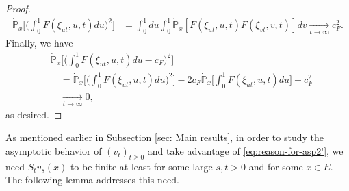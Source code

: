 \documentclass[UTF8]{pkuthss}
\theoremstyle{plain}
\theoremstyle{definition}
\numberwithin{equation}{section}
\begin{document}
\begin{proof}
\[\begin{split}
	\dot{\mathbb P}_x\Big[\big(\int_0^1 F(\xi_{ut},u,t)du\big)^2\Big]
	&=\int_0^1du\int_0^1\dot{\mathbb P}_x[F(\xi_{ut},u,t)F(\xi_{vt},v,t)]dv\xrightarrow[t\to\infty]{} c_F^2.
\end{split}\]
	Finally, we have
\[\begin{split}
	&\dot{\mathbb P}_x\Big[\big(\int_0^1 F(\xi_{ut},u,t)du - c_F\big)^2\Big]\\
	&\quad =\dot{\mathbb P}_x\Big[\big(\int_0^1 F(\xi_{ut},u,t)du\big)^2\Big] -2c_F \dot{\mathbb P}_x\Big[\int_0^1 F(\xi_{ut},u,t)du\Big]+ c_F^2\\
	&\quad \xrightarrow[t\to\infty]{} 0,
\end{split}\]
	as desired.
\end{proof}

	As mentioned earlier in Subsection \ref{sec: Main results}, in order to study the asymptotic behavior of $(v_t)_{t\geq 0}$ and take advantage of \eqref{eq:reason-for-asp2'}, we need $S_t v_s(x)$ to be finite  at least for some large $s,t>0$ and for some $x\in E$.
	The following lemma addresses this need.
\end{document}
